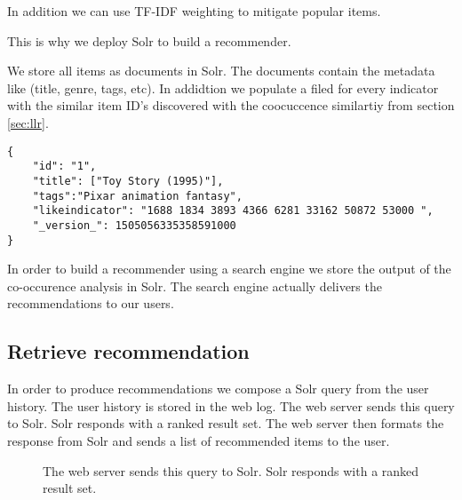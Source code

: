 In addition we can use TF-IDF \cite{Manning} weighting to mitigate popular items.

This is why we deploy Solr to build a recommender.

We store all items as documents in Solr. The documents contain the metadata like (title, genre, tags, etc). In addidtion we populate a filed for every indicator with the similar item ID's discovered with the coocuccence similartiy from section \ref{sec:llr}.

\begin{lstlisting}[caption={Item metadata and similar items are stored in Solr.},label={lst:solrdoc}]
{
    "id": "1",
    "title": ["Toy Story (1995)"],
    "tags":"Pixar animation fantasy",
    "likeindicator": "1688 1834 3893 4366 6281 33162 50872 53000 ",
    "_version_": 1505056335358591000
}
\end{lstlisting}

In order to build a recommender using a search engine we store the output of the co-occurence analysis in Solr. The search engine actually delivers the recommendations to our users.

\subsection{Retrieve recommendation}

In order to produce recommendations we compose a Solr query from the user history. The user history is stored in the web log. The web server sends this query to Solr. Solr responds with a ranked result set. The web server then formats the response from Solr and sends a list of recommended items to the user.

\begin{figure}
\centering
{}
\caption{The web server sends this query to Solr. Solr responds with a ranked result set.}
\end{figure}


